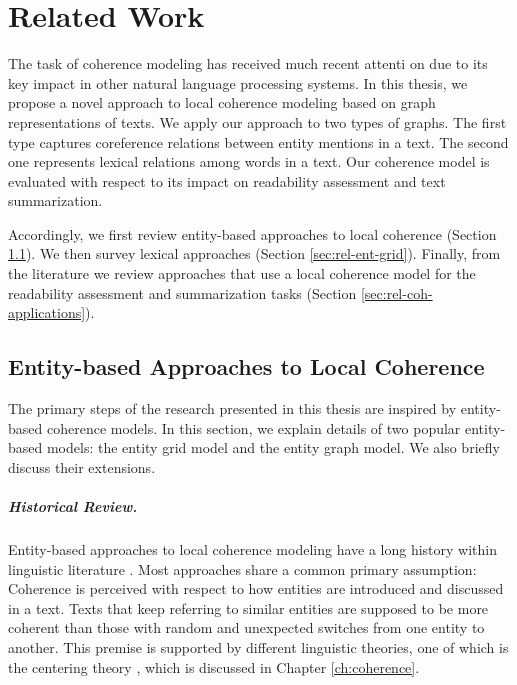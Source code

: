 
\chapter{Related Work}
\label{ch:rel-work}
 
The task of coherence modeling has received much recent attenti	on due to its key impact in other natural language processing systems. 
In this thesis, we propose a novel approach to local coherence modeling based on graph representations of texts. 
We apply our approach to two types of graphs.  
The first type captures coreference relations between entity mentions in a text.
The second one represents lexical relations among words in a text.  
Our coherence model is evaluated with respect to its impact on readability assessment and text summarization. 

Accordingly, we first review entity-based approaches to local coherence (Section \ref{sec:rel-entity-models}). 
We then survey lexical approaches (Section \ref{sec:rel-ent-grid}). 
Finally, from the literature we review approaches that use a local coherence model for the readability assessment and summarization tasks (Section \ref{sec:rel-coh-applications}). 

\section{Entity-based Approaches to Local Coherence}
\label{sec:rel-entity-models}

The primary steps of the research presented in this thesis are inspired by entity-based coherence models. 
In this section, we explain details of two popular entity-based models: the entity grid model and the entity graph model. 
We also briefly discuss their extensions.  

\paragraph{Historical Review.} 
Entity-based approaches to local coherence modeling have a long history within linguistic literature \cite{kuno72,halliday76,prince81a,joshi98}.
Most approaches share a common primary assumption: Coherence is perceived with respect to how entities are introduced and discussed in a text. 
Texts that keep referring to similar entities are supposed to be more coherent than those with random and unexpected switches from one entity to another. 
This premise is supported by different linguistic theories, one of which is the centering theory \cite{grosz95,joshi98}, which is discussed in Chapter \ref{ch:coherence}. 


